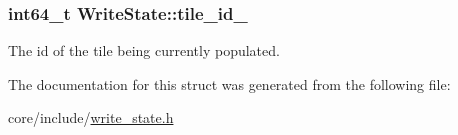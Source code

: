 \subsubsection[{tile\+\_\+id\+\_\+}]{\setlength{\rightskip}{0pt plus 5cm}int64\+\_\+t Write\+State\+::tile\+\_\+id\+\_\+\hspace{0.3cm}{\ttfamily [private]}}\label{structWriteState_a6f1997f7702ccd133959484348faf49d}
The id of the tile being currently populated. 

The documentation for this struct was generated from the following file\+:\begin{DoxyCompactItemize}
\item 
core/include/\hyperlink{write__state_8h}{write\+\_\+state.\+h}\end{DoxyCompactItemize}
